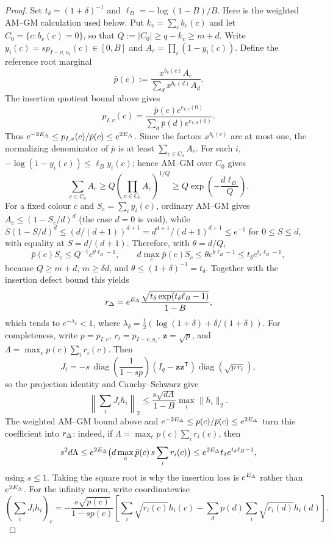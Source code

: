 \begin{proof}
Set $t_\delta=(1+\delta)^{-1}$ and
$\ell_B=-\log(1-B)/B$.  Here is the weighted AM--GM calculation used
below.  Put $k_v=\sum_cb_v(c)$ and let
$C_0=\{c:b_v(c)=0\}$, so that
$Q:=|C_0|\ge q-k_v\ge m+d$.  Write
$y_i(c)=s p_{I-v,u_i}(c)\in[0,B]$ and
$A_c=\prod_i(1-y_i(c))$.  Define the reference root marginal
\[
  \bar p(c):=\frac{x^{b_v(c)}A_c}{\sum_d x^{b_v(d)}A_d}.
\]
The insertion quotient bound above gives
\[
 p_{I,v}(c)=
 \frac{\bar p(c)e^{e_{v,c}(0)}}
      {\sum_d\bar p(d)e^{e_{v,d}(0)}}.
\]
Thus \(e^{-2E_\Delta}\le p_{I,v}(c)/\bar p(c)\le e^{2E_\Delta}\).
Since the factors $x^{b_v(c)}$ are at most one,
the normalizing denominator of $\bar p$ is at least
$\sum_{c\in C_0}A_c$.  For each $i$,
$-\log(1-y_i(c))\le\ell_B y_i(c)$; hence AM--GM over $C_0$ gives
\[
 \sum_{c\in C_0}A_c
 \ge Q\left(\prod_{c\in C_0}A_c\right)^{1/Q}
 \ge Q\exp\!\left(-\frac{d\ell_B}{Q}\right).
\]
For a fixed colour $c$ and $S_c=\sum_i y_i(c)$, ordinary AM--GM gives
$A_c\le(1-S_c/d)^d$ (the case $d=0$ is void), while
$S(1-S/d)^d\le (d/(d+1))^{d+1}=d^{d+1}/(d+1)^{d+1}\le e^{-1}$ for $0\le S\le d$, with equality at $S=d/(d+1)$.
Therefore, with $\theta=d/Q$,
\[
 \bar p(c)S_c\le Q^{-1}e^{\theta\ell_B-1},\qquad
 d\max_c\bar p(c)S_c
 \le\theta e^{\theta\ell_B-1}
 \le t_\delta e^{t_\delta\ell_B-1},
\]
because $Q\ge m+d$, $m\ge\delta d$, and
$\theta\le(1+\delta)^{-1}=t_\delta$.  Together with the insertion
defect bound this yields
\[
 r_\Delta=e^{E_\Delta}
 \frac{\sqrt{t_\delta\exp(t_\delta\ell_B-1)}}{1-B},
\]
which tends to $e^{-\lambda_\delta}<1$, where
$\lambda_\delta=\tfrac12(\log(1+\delta)+\delta/(1+\delta))$.
For completeness, write $p=p_{I,v}$, $r_i=p_{I-v,u_i}$,
$\mathbf z=\sqrt p$, and
$\Lambda=\max_c p(c)\sum_i r_i(c)$.  Then
\[
 J_i=-s\,\operatorname{diag}\!\left(\frac1{1-sp}\right)
 (I_q-\mathbf z\mathbf z^{\mathsf T})\operatorname{diag}\!\left(\sqrt{p\,r_i}\right),
\]
so the projection identity and Cauchy--Schwarz give
\[
 \left\|\sum_iJ_ih_i\right\|_2
 \le\frac{s\sqrt{d\Lambda}}{1-B}\max_i\|h_i\|_2.
\]
The weighted AM--GM bound above and
$e^{-2E_\Delta}\le p(c)/\bar p(c)\le e^{2E_\Delta}$
turn this coefficient into $r_\Delta$: indeed, if
$\Lambda=\max_c p(c)\sum_i r_i(c)$, then
\[
 s^2d\Lambda\le e^{2E_\Delta}
 \bigl(d\max_c\bar p(c)\,s\sum_i r_i(c)\bigr)
 \le e^{2E_\Delta}t_\delta e^{t_\delta\ell_B-1},
\]
using $s\le1$.  Taking the square root is why the insertion loss is
$e^{E_\Delta}$ rather than $e^{2E_\Delta}$.  For the infinity norm, write
coordinatewise
\[
 \left(\sum_iJ_ih_i\right)_c
 =-\frac{s\sqrt{p(c)}}{1-sp(c)}
 \left[\sum_i\sqrt{r_i(c)}h_i(c)
 -\sum_d p(d)\sum_i\sqrt{r_i(d)}h_i(d)\right].
\]
\end{proof}
